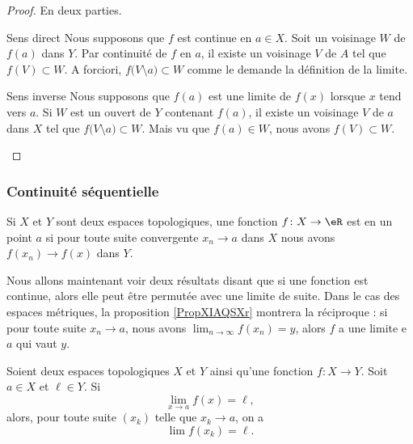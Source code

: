 \begin{proof}
    En deux parties.
    \begin{subproof}
        \item[Sens direct]
            Nous supposons que \( f\) est continue en \( a\in X\). Soit un voisinage \( W\) de \( f(a)\) dans \( Y\). Par continuité de \( f\) en \( a\), il existe un voisinage \( V\) de \( A\) tel que \( f(V)\subset W\). A forciori, \( f\big( V\setminus{{a}} \big)\subset W\) comme le demande la définition de la limite.
        \item[Sens inverse]
            Nous supposons que \( f(a)\) est une limite de \( f(x)\) lorsque \( x\) tend vers \( a\). Si \( W\) est un ouvert de \( Y\) contenant \( f(a)\), il existe un voisinage \( V\) de \( a\) dans \( X\) tel que \( f\big( V\setminus{{a}} \big)\subset W\). Mais vu que \( f(a)\in W\), nous avons \( f(V)\subset W\).
    \end{subproof}
\end{proof}

\subsubsection{Continuité séquentielle}

\begin{definition}  \label{DefENioICV}
    Si \( X\) et \( Y \) sont deux espaces topologiques, une fonction \( f\colon X\to \eR\) est  en un point \( a\) si pour toute suite convergente \( x_n\to a\) dans \( X\) nous avons \( f(x_n)\to f(x)\) dans \( Y\).
\end{definition}

\begin{normaltext}
    Nous allons maintenant voir deux résultats disant que si une fonction est continue, alors elle peut être permutée avec une limite de suite. Dans le cas des espaces métriques, la proposition \ref{PropXIAQSXr} montrera la réciproque : si pour toute suite \(x_n\to a\), nous avons \( \lim_{n\to \infty} f(x_n)=y\), alors \( f\) a une limite e \( a\) qui vaut \( y\).
\end{normaltext}

\begin{proposition} \label{fContEstSeqCont}
  Soient deux espaces topologiques \( X\) et \( Y\) ainsi qu'une fonction \( f\colon X\to Y\). Soit \( a\in X\) et \( \ell\in Y\). Si
  \begin{equation}
    \lim_{x\to a} f(x)=\ell,
  \end{equation}
  alors, pour toute suite \( (x_k) \) telle que \( x_k \to a \), on a
  \begin{equation}
    \lim f(x_k)=\ell.
  \end{equation}
\end{proposition}

